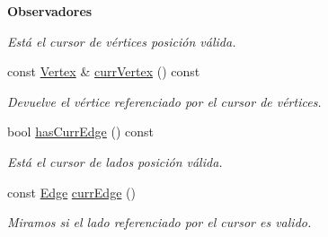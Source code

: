 \begin{Indent}{\bf Observadores}
\begin{DoxyCompactItemize}
\begin{DoxyCompactList}\small\item\em Está el cursor de vértices posición válida. \end{DoxyCompactList}\item 
const \hyperlink{classedi_1_1Vertex}{Vertex} \& \hyperlink{classedi_1_1GraphMatrix_a3e1ebb6cfd5bafafd05cd94b9cf12b54}{curr\+Vertex} () const 
\begin{DoxyCompactList}\small\item\em Devuelve el vértice referenciado por el cursor de vértices. \end{DoxyCompactList}\item 
bool \hyperlink{classedi_1_1GraphMatrix_a0edc09b18604d94eb4692cbff0d4ce2a}{has\+Curr\+Edge} () const 
\begin{DoxyCompactList}\small\item\em Está el cursor de lados posición válida. \end{DoxyCompactList}\item 
const \hyperlink{classedi_1_1Edge}{Edge} \hyperlink{classedi_1_1GraphMatrix_ada0a9c50e87493338527baab50600501}{curr\+Edge} ()
\begin{DoxyCompactList}\small\item\em Miramos si el lado referenciado por el cursor es valido. \end{DoxyCompactList}\end{DoxyCompactItemize}
\end{Indent}
